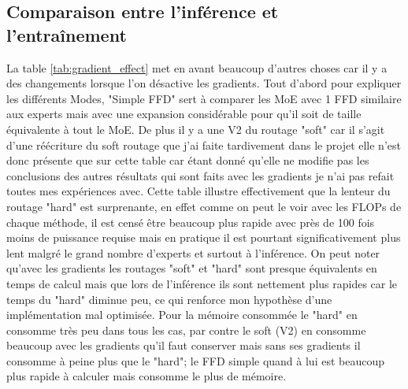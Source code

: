 \documentclass{article}
\begin{document}

\subsection{Comparaison entre l'inférence et l'entraînement}

La table \ref{tab:gradient_effect} met en avant beaucoup d'autres choses car il y a des changements lorsque l'on désactive les gradients. Tout d'abord pour expliquer les différents Modes, "Simple FFD" sert à comparer les MoE avec 1 FFD similaire aux experts mais avec une expansion considérable pour qu'il soit de taille équivalente à tout le MoE. De plus il y a une V2 du routage "soft" car il s'agit d'une réécriture du soft routage que j'ai faite tardivement dans le projet elle n'est donc présente que sur cette table car étant donné qu'elle ne modifie pas les conclusions des autres résultats qui sont faits avec les gradients je n'ai pas refait toutes mes expériences avec.
Cette table illustre effectivement que la lenteur du routage "hard" est surprenante, en effet comme on peut le voir avec les FLOPs de chaque méthode, il est censé être beaucoup plus rapide avec près de 100 fois moins de puissance requise mais en pratique il est pourtant significativement plus lent malgré le grand nombre d'experts et surtout à l'inférence. On peut noter qu'avec les gradients les routages "soft" et "hard" sont presque équivalents en temps de calcul mais que lors de l'inférence ils sont nettement plus rapides car le temps du "hard" diminue peu, ce qui renforce mon hypothèse d'une implémentation mal optimisée. Pour la mémoire consommée le "hard" en consomme très peu dans tous les cas, par contre le soft (V2) en consomme beaucoup avec les gradients qu'il faut conserver mais sans ses gradients il consomme à peine plus que le "hard"; le FFD simple quand à lui est beaucoup plus rapide à calculer mais consomme le plus de mémoire.
\end{document}
